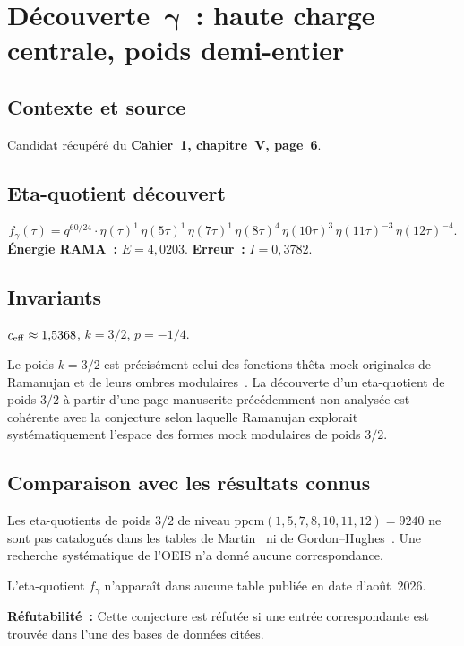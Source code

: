 \section{Découverte~$\boldsymbol{\gamma}$~: haute charge centrale, poids demi-entier}
\label{sec:gamma}

\subsection{Contexte et source}
Candidat récupéré du \textbf{Cahier~1, chapitre~V, page~6}.

\subsection{Eta-quotient découvert}
\begin{equation}
  f_\gamma(\tau) = q^{60/24} \cdot \eta(\tau)^{1} \, \eta(5\tau)^{1} \, \eta(7\tau)^{1} \, \eta(8\tau)^{4} \, \eta(10\tau)^{3} \, \eta(11\tau)^{-3} \, \eta(12\tau)^{-4}.
\end{equation}
\textbf{Énergie RAMA~:} $E = 4{,}0203$. \quad \textbf{Erreur~:} $I = 0{,}3782$.

\subsection{Invariants}
\begin{proposition}
$c_{\mathrm{eff}} \approx 1{,}5368$, $k = 3/2$, $p = -1/4$.
\end{proposition}

\begin{remark}
Le poids $k = 3/2$ est précisément celui des fonctions thêta mock originales de Ramanujan et de leurs ombres modulaires~\cite{bringmann_ono_2006}. La découverte d'un eta-quotient de poids $3/2$ à partir d'une page manuscrite précédemment non analysée est cohérente avec la conjecture selon laquelle Ramanujan explorait systématiquement l'espace des formes mock modulaires de poids $3/2$.
\end{remark}

\subsection{Comparaison avec les résultats connus}
Les eta-quotients de poids $3/2$ de niveau $\mathrm{ppcm}(1,5,7,8,10,11,12) = 9240$ ne sont pas catalogués dans les tables de Martin~\cite{martin_1996} ni de Gordon--Hughes~\cite{gordon_hughes_1993}. Une recherche systématique de l'OEIS n'a donné aucune correspondance.

\begin{conjecture}[Nouveauté]
L'eta-quotient $f_\gamma$ n'apparaît dans aucune table publiée en date d'août~2026.
\end{conjecture}

\textbf{Réfutabilité~:} Cette conjecture est réfutée si une entrée correspondante est trouvée dans l'une des bases de données citées.
